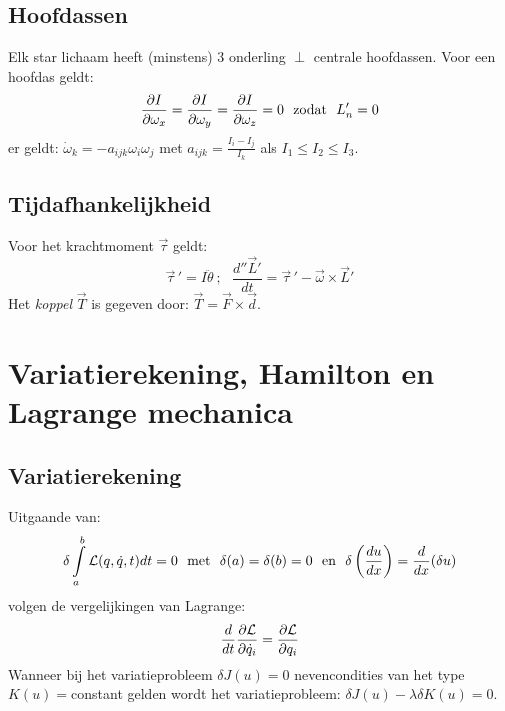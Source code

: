 \documentclass[twoside]{report}
\begin{document}
\subsection{Hoofdassen}
Elk star lichaam heeft (minstens) 3 onderling $\perp$ centrale hoofdassen.
Voor een hoofdas geldt:
\[
\frac{\partial I}{\partial \omega_x}=\frac{\partial I}{\partial \omega_y}=\frac{\partial I}{\partial \omega_z}=0~~\mbox{zodat}~~L'_n=0
\]
er geldt: $\dot{\omega}_k=-a_{ijk}\omega_i\omega_j$ met
$\displaystyle a_{ijk}=\frac{I_i-I_j}{I_k}$ als $I_1\leq I_2\leq I_3$.

\subsection{Tijdafhankelijkheid}
Voor het krachtmoment $\vec{\tau}$ geldt:
\[
\vec{\tau}\,'=I\ddot{\theta}~;~~~\frac{d''\vec{L}'}{dt}=\vec{\tau}\,'-\vec{\omega}\times\vec{L}'
\]
Het {\it koppel} $\vec{T}$ is gegeven door: $\vec{T}=\vec{F}\times\vec{d}$.

\section{Variatierekening, Hamilton en Lagrange mechanica}
\subsection{Variatierekening}
Uitgaande van:
\[
\delta\int\limits_a^b{\cal L}(q,\dot{q},t)dt=0\mbox{~~met~~}\delta(a)=\delta(b)=0\mbox{~~en~~}
\delta\left(\frac{du}{dx}\right)=\frac{d}{dx}(\delta u)
\]
volgen de vergelijkingen van Lagrange:
\[
\frac{d}{dt}\frac{\partial {\cal L}}{\partial \dot{q}_i}=\frac{\partial {\cal L}}{\partial q_i}
\]
Wanneer bij het variatieprobleem $\delta J(u)=0$ nevencondities van het type
$K(u)=$constant gelden wordt het variatieprobleem:
$\delta J(u)-\lambda\delta K(u)=0$.
\end{document}
